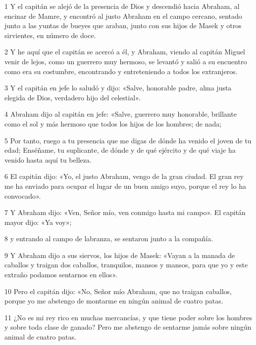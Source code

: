 \par 1 Y el capitán se alejó de la presencia de Dios y descendió hacia Abraham, al encinar de Mamre, y encontró al justo Abraham en el campo cercano, sentado junto a las yuntas de bueyes que araban, junto con sus hijos de Masek y otros sirvientes, en número de doce.

\par 2 Y he aquí que el capitán se acercó a él, y Abraham, viendo al capitán Miguel venir de lejos, como un guerrero muy hermoso, se levantó y salió a su encuentro como era su costumbre, encontrando y entreteniendo a todos los extranjeros.

\par 3 Y el capitán en jefe lo saludó y dijo: «Salve, honorable padre, alma justa elegida de Dios, verdadero hijo del celestial».

\par 4 Abraham dijo al capitán en jefe: «Salve, guerrero muy honorable, brillante como el sol y más hermoso que todos los hijos de los hombres; de nada;

\par 5 Por tanto, ruego a tu presencia que me digas de dónde ha venido el joven de tu edad; Enséñame, tu suplicante, de dónde y de qué ejército y de qué viaje ha venido hasta aquí tu belleza.

\par 6 El capitán dijo: «Yo, el justo Abraham, vengo de la gran ciudad. El gran rey me ha enviado para ocupar el lugar de un buen amigo suyo, porque el rey lo ha convocado».

\par 7 Y Abraham dijo: «Ven, Señor mío, ven conmigo hasta mi campo». El capitán mayor dijo: «Ya voy»;

\par 8 y entrando al campo de labranza, se sentaron junto a la compañía.

\par 9 Y Abraham dijo a sus siervos, los hijos de Masek: «Vayan a la manada de caballos y traigan dos caballos, tranquilos, mansos y mansos, para que yo y este extraño podamos sentarnos en ellos».

\par 10 Pero el capitán dijo: «No, Señor mío Abraham, que no traigan caballos, porque yo me abstengo de montarme en ningún animal de cuatro patas.

\par 11 ¿No es mi rey rico en muchas mercancías, y que tiene poder sobre los hombres y sobre toda clase de ganado? Pero me abstengo de sentarme jamás sobre ningún animal de cuatro patas.

